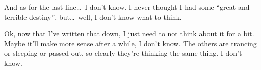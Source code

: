 And as for the last line\dots\ I don't know. I never thought I had some ``great and terrible destiny'', but\dots\ well, I don't know what to think.

\pause

Ok, now that I've written that down, I just need to not think about it for a bit. Maybe it'll make more sense after a while, I don't know. The others are trancing or sleeping or passed out, so clearly they're thinking the same thing. I don't know.
